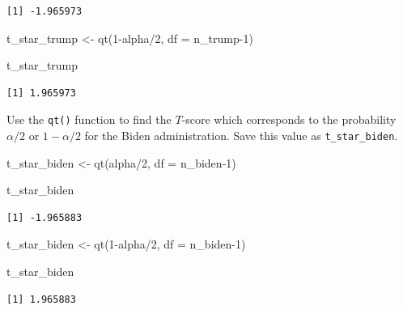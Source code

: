 \documentclass[
  letterpaper,
  DIV=11,
  numbers=noendperiod]{scrartcl}
\newenvironment{Shaded}{\begin{snugshade}}{\end{snugshade}}
\newcommand{\AttributeTok}[1]{\textcolor[rgb]{0.40,0.45,0.13}{#1}}
\newcommand{\DecValTok}[1]{\textcolor[rgb]{0.68,0.00,0.00}{#1}}
\newcommand{\FunctionTok}[1]{\textcolor[rgb]{0.28,0.35,0.67}{#1}}
\newcommand{\NormalTok}[1]{\textcolor[rgb]{0.00,0.23,0.31}{#1}}
\newcommand{\OtherTok}[1]{\textcolor[rgb]{0.00,0.23,0.31}{#1}}
\newcommand{\SpecialCharTok}[1]{\textcolor[rgb]{0.37,0.37,0.37}{#1}}
\begin{document}
\begin{verbatim}
[1] -1.965973
\end{verbatim}

\begin{Shaded}
\begin{Highlighting}[]
\NormalTok{t\_star\_trump }\OtherTok{\textless{}{-}} \FunctionTok{qt}\NormalTok{(}\DecValTok{1}\SpecialCharTok{{-}}\NormalTok{alpha}\SpecialCharTok{/}\DecValTok{2}\NormalTok{, }
                   \AttributeTok{df =}\NormalTok{ n\_trump}\DecValTok{{-}1}\NormalTok{)}

\NormalTok{t\_star\_trump}
\end{Highlighting}
\end{Shaded}

\begin{verbatim}
[1] 1.965973
\end{verbatim}

Use the \texttt{qt()} function to find the \(T\)-score which corresponds
to the probability \(\alpha/2\) or \(1-\alpha/2\) for the Biden
administration. Save this value as \texttt{t\_star\_biden}.

\begin{Shaded}
\begin{Highlighting}[]
\NormalTok{t\_star\_biden }\OtherTok{\textless{}{-}} \FunctionTok{qt}\NormalTok{(alpha}\SpecialCharTok{/}\DecValTok{2}\NormalTok{, }
                   \AttributeTok{df =}\NormalTok{ n\_biden}\DecValTok{{-}1}\NormalTok{)}

\NormalTok{t\_star\_biden}
\end{Highlighting}
\end{Shaded}

\begin{verbatim}
[1] -1.965883
\end{verbatim}

\begin{Shaded}
\begin{Highlighting}[]
\NormalTok{t\_star\_biden }\OtherTok{\textless{}{-}} \FunctionTok{qt}\NormalTok{(}\DecValTok{1}\SpecialCharTok{{-}}\NormalTok{alpha}\SpecialCharTok{/}\DecValTok{2}\NormalTok{, }
                   \AttributeTok{df =}\NormalTok{ n\_biden}\DecValTok{{-}1}\NormalTok{)}

\NormalTok{t\_star\_biden}
\end{Highlighting}
\end{Shaded}

\begin{verbatim}
[1] 1.965883
\end{verbatim}
\end{document}
